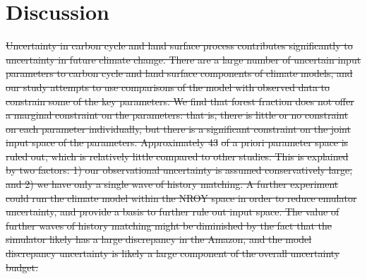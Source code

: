 \documentclass[esd, manuscript]{copernicus}
\providecommand{\DIFdel}[1]{{\protect\color{red}\sout{#1}}}                      %
\providecommand{\DIFdelbegin}{} %
\begin{document}

\section{Discussion}\label{sec:discussion}
\DIFdelbegin \DIFdel{Uncertainty in carbon cycle and land surface process contributes significantly to uncertainty in future climate change. There are a large number of uncertain input parameters to carbon cycle and land surface components of climate models, and our study attempts to use comparisons of the model with observed data to constrain some of the key parameters. We find that forest fraction does not offer a marginal constraint on the parameters: that is, there is little or no constraint on each parameter individually, but there is a significant constraint on the joint input space of the parameters. Approximately 43}%
\DIFdel{of a priori parameter space is ruled out, which is relatively little compared to other studies. This is explained by two factors: 1) our observational uncertainty is assumed conservatively large, and 2) we have only a single wave of history matching. A further experiment could run the climate model within the NROY space in order to reduce emulator uncertainty, and provide a basis to further rule out input space. The value of further waves of history matching might be diminished by the fact that the simulator likely has a large discrepancy in the Amazon, and the model discrepancy uncertainty is likely a large component of the overall uncertainty budget.
}%
\end{document}
